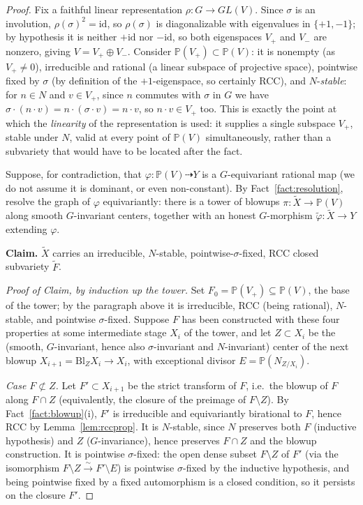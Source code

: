 \documentclass[11pt]{article}
\theoremstyle{plain}
\theoremstyle{definition}
\theoremstyle{remark}
\newcommand{\PP}{\mathbb P}
\newcommand{\dashto}{\dashrightarrow}
\begin{document}
\begin{proof}
Fix a faithful linear representation $\rho:G\to GL(V)$. Since $\sigma$
is an involution, $\rho(\sigma)^2=\mathrm{id}$, so $\rho(\sigma)$ is
diagonalizable with eigenvalues in $\{+1,-1\}$; by hypothesis it is
neither $+\mathrm{id}$ nor $-\mathrm{id}$, so both eigenspaces $V_+$
and $V_-$ are nonzero, giving $V=V_+\oplus V_-$. Consider $\PP(V_+)
\subset\PP(V)$: it is nonempty (as $V_+\ne 0$), irreducible and
rational (a linear subspace of projective space), pointwise fixed by
$\sigma$ (by definition of the $+1$-eigenspace, so certainly RCC), and
$N$-\emph{stable}: for $n\in N$ and $v\in V_+$, since $n$ commutes with
$\sigma$ in $G$ we have $\sigma\cdot(n\cdot v)=n\cdot(\sigma\cdot v)=n
\cdot v$, so $n\cdot v\in V_+$ too. This is exactly the point at which
the \emph{linearity} of the representation is used: it supplies a
single subspace $V_+$, stable under $N$, valid at every point of
$\PP(V)$ simultaneously, rather than a subvariety that would have to be
located after the fact.

Suppose, for contradiction, that $\varphi:\PP(V)\dashto Y$ is a
$G$-equivariant rational map (we do not assume it is dominant, or even
non-constant). By Fact~\ref{fact:resolution}, resolve the graph of
$\varphi$ equivariantly: there is a tower of blowups $\pi:\widetilde X
\to\PP(V)$ along smooth $G$-invariant centers, together with an honest
$G$-morphism $\widetilde\varphi:\widetilde X\to Y$ extending $\varphi$.

\smallskip
\noindent\textbf{Claim.} $\widetilde X$ carries an irreducible,
$N$-stable, pointwise-$\sigma$-fixed, RCC closed subvariety
$\widetilde F$.

\smallskip
\noindent\textit{Proof of Claim, by induction up the tower.} Set
$F_0=\PP(V_+)\subseteq\PP(V)$, the base of the tower; by the paragraph
above it is irreducible, RCC (being rational), $N$-stable, and
pointwise $\sigma$-fixed. Suppose $F$ has been constructed with these
four properties at some intermediate stage $X_i$ of the tower, and let
$Z\subset X_i$ be the (smooth, $G$-invariant, hence also
$\sigma$-invariant and $N$-invariant) center of the next blowup $X_{i+1}
=\mathrm{Bl}_ZX_i\to X_i$, with exceptional divisor $E=\PP(N_{Z/X_i})$.

\emph{Case $F\not\subset Z$.} Let $F'\subset X_{i+1}$ be the strict
transform of $F$, i.e.\ the blowup of $F$ along $F\cap Z$ (equivalently,
the closure of the preimage of $F\setminus Z$). By
Fact~\ref{fact:blowup}(i), $F'$ is irreducible and equivariantly
birational to $F$, hence RCC by Lemma~\ref{lem:rccprop}. It is
$N$-stable, since $N$ preserves both $F$ (inductive hypothesis) and $Z$
($G$-invariance), hence preserves $F\cap Z$ and the blowup construction.
It is pointwise $\sigma$-fixed: the open dense subset $F\setminus Z$ of
$F'$ (via the isomorphism $F\setminus Z\xrightarrow{\sim}F'\setminus E$)
is pointwise $\sigma$-fixed by the inductive hypothesis, and being
pointwise fixed by a fixed automorphism is a closed condition, so it
persists on the closure $F'$.


\end{proof}
\end{document}
